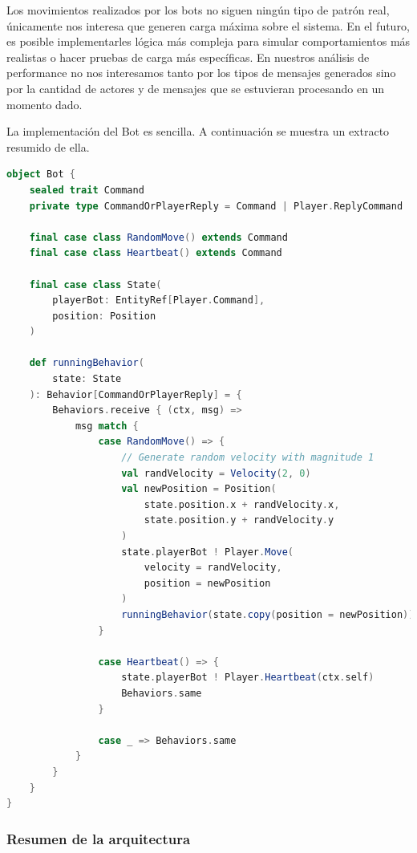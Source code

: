 Los movimientos realizados por los bots no siguen ningún tipo de patrón real, únicamente nos interesa que generen carga máxima sobre el sistema.
En el futuro, es posible implementarles lógica más compleja para simular comportamientos más realistas o hacer pruebas de carga más específicas.
En nuestros análisis de performance no nos interesamos tanto por los tipos de mensajes generados sino por la cantidad de actores y de mensajes que se estuvieran
procesando en un momento dado.

La implementación del Bot es sencilla. A continuación se muestra un extracto resumido de ella.

\begin{lstlisting}[language=Scala, caption={\textbf{Implementación del actor Bot}}]
object Bot {
    sealed trait Command
    private type CommandOrPlayerReply = Command | Player.ReplyCommand
    
    final case class RandomMove() extends Command
    final case class Heartbeat() extends Command
    
    final case class State(
        playerBot: EntityRef[Player.Command],
        position: Position
    )
    
    def runningBehavior(
        state: State
    ): Behavior[CommandOrPlayerReply] = {
        Behaviors.receive { (ctx, msg) =>
            msg match {
                case RandomMove() => {
                    // Generate random velocity with magnitude 1
                    val randVelocity = Velocity(2, 0)
                    val newPosition = Position(
                        state.position.x + randVelocity.x,
                        state.position.y + randVelocity.y
                    )
                    state.playerBot ! Player.Move(
                        velocity = randVelocity,
                        position = newPosition
                    )
                    runningBehavior(state.copy(position = newPosition))
                }

                case Heartbeat() => {
                    state.playerBot ! Player.Heartbeat(ctx.self)
                    Behaviors.same
                }
        
                case _ => Behaviors.same
            }
        }
    }
}
\end{lstlisting}

\subsubsection{Resumen de la arquitectura}

